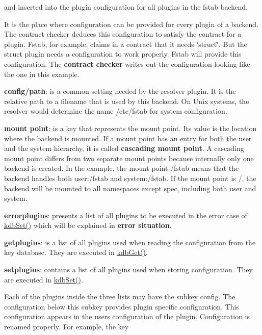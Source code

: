and inserted into the plugin configuration for all plugins in the {\ttfamily fstab} backend.

It is the place where configuration can be provided for every plugin of a backend. The contract checker deduces this configuration to satisfy the contract for a plugin. Fstab, for example, claims in a contract that it needs \char`\"{}struct\char`\"{}. But the struct plugin needs a configuration to work properly. Fstab will provide this configuration. The {\bfseries contract checker} writes out the configuration looking like the one in this example.


\begin{DoxyItemize}
\item {\bfseries config/path}\+: is a common setting needed by the resolver plugin. It is the relative path to a filename that is used by this backend. On Unix systems, the resolver would determine the name {\ttfamily /etc/fstab} for system configuration.
\item {\bfseries mount point}\+: is a key that represents the mount point. Its value is the location where the backend is mounted. If a mount point has an entry for both the user and the system hierarchy, it is called {\bfseries cascading mount point}. A cascading mount point differs from two separate mount points because internally only one backend is created. In the example, the mount point {\ttfamily /fstab} means that the backend handles both {\ttfamily user\+:/fstab} and {\ttfamily system\+:/fstab}. If the mount point is {\ttfamily /}, the backend will be mounted to all namespaces except {\ttfamily spec}, including both {\ttfamily user} and {\ttfamily system}.
\item {\bfseries errorplugins}\+: presents a list of all plugins to be executed in the error case of {\ttfamily \hyperlink{group__kdb_ga11436b058408f83d303ca5e996832bcf}{kdb\+Set()}} which will be explained in {\bfseries error situation}.
\item {\bfseries getplugins}\+: is a list of all plugins used when reading the configuration from the key database. They are executed in {\ttfamily \hyperlink{group__kdb_ga28e385fd9cb7ccfe0b2f1ed2f62453a1}{kdb\+Get()}}.
\item {\bfseries setplugins}\+: contains a list of all plugins used when storing configuration. They are executed in {\ttfamily \hyperlink{group__kdb_ga11436b058408f83d303ca5e996832bcf}{kdb\+Set()}}.
\end{DoxyItemize}

Each of the plugins inside the three lists may have the subkey {\ttfamily config}. The configuration below this subkey provides plugin specific configuration. This configuration appears in the user\textquotesingle{}s configuration of the plugin. Configuration is renamed properly. For example, the key


